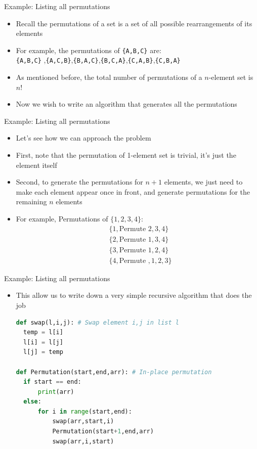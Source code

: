 \documentclass[10pt,xcolor={table,dvipsnames},t]{beamer}
\begin{document}
\begin{frame}{Example: Listing all permutations}
  \begin{itemize}
    \item Recall the permutations of a set is a set of all possible rearrangements of its elements
    \item For example, the permutations of \texttt{\{A,B,C\}} are:\\ \texttt{\{A,B,C\}} ,\texttt{\{A,C,B\}},\texttt{\{B,A,C\}},\texttt{\{B,C,A\}},\texttt{\{C,A,B\}},\texttt{\{C,B,A\}}     
    \item As mentioned before, the total number of permutations of a $n$-element set is $n!$
    \item Now we wish to write an algorithm that generates all the permutations
  \end{itemize}
\end{frame}

\begin{frame}{Example: Listing all permutations}
  \begin{itemize}
    \item Let's see how we can approach the problem 
    \item First, note that the permutation of 1-element set is trivial, it's just the element itself 
    \item Second, to generate the permutations for $n+1$ elements, we just need to make each element appear once in front, and generate permutations for the remaining $n$ elements
    \item For example, Permutations of $\{1,2,3,4\}$:
    \begin{align*}
      &\{1,\text{Permute } 2,3,4\}\\
      &\{2,\text{Permute } 1,3,4\}\\
      &\{3,\text{Permute } 1,2,4\}\\
      &\{4,\text{Permute },1,2,3\}
    \end{align*}
  \end{itemize}
\end{frame}

\begin{frame}[fragile]{Example: Listing all permutations}
  \begin{itemize}
    \item This allow us to write down a very simple recursive algorithm that does the job
\begin{lstlisting}[language=python]
def swap(l,i,j): # Swap element i,j in list l
  temp = l[i]
  l[i] = l[j]
  l[j] = temp

def Permutation(start,end,arr): # In-place permutation
  if start == end:
      print(arr)
  else:
      for i in range(start,end):
          swap(arr,start,i)
          Permutation(start+1,end,arr)
          swap(arr,i,start)
\end{lstlisting}
  \end{itemize}
\end{frame}
\end{document}
